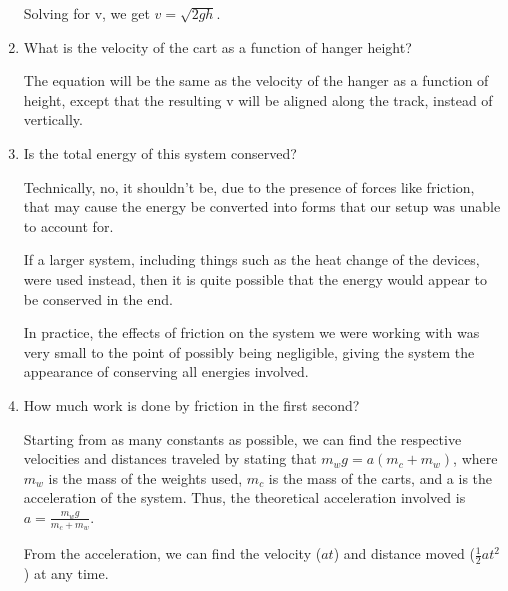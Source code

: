 \begin{enumerate}
Solving for v, we get \begin{math}v = \sqrt{2gh}\end{math}.

\item What is the velocity of the cart as a function of hanger height?

The equation will be the same as the velocity of the hanger as a function of height, except that the resulting v will be aligned along the track, instead of vertically.

\item Is the total energy of this system conserved?

Technically, no, it shouldn't be, due to the presence of forces like friction, that may cause the energy be converted into forms that our setup was unable to account for.

If a larger system, including things such as the heat change of the devices, were used instead, then it is quite possible that the energy would appear to be conserved in the end.

In practice, the effects of friction on the system we were working with was very small to the point of possibly being negligible, giving the system the appearance of conserving all energies involved.

\item How much work is done by friction in the first second?

Starting from as many constants as possible, we can find the respective velocities and distances traveled by stating that \begin{math}m_w g = a (m_c + m_w) \end{math}, where \begin{math}m_w\end{math}
is the mass of the weights used, \begin{math}m_c\end{math} is the mass of the carts, and a is the acceleration of the system.
Thus, the theoretical acceleration involved is \begin{math}a = \frac{m_w g}{m_c + m_w}\end{math}.

From the acceleration, we can find the velocity (\begin{math}at\end{math}) and distance moved (\begin{math}\frac{1}{2}at^2\end{math}) at any time.


\end{enumerate}
